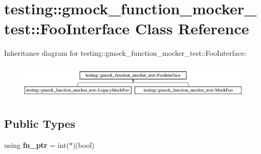 \hypertarget{classtesting_1_1gmock__function__mocker__test_1_1FooInterface}{}\section{testing\+:\+:gmock\+\_\+function\+\_\+mocker\+\_\+test\+:\+:Foo\+Interface Class Reference}
\label{classtesting_1_1gmock__function__mocker__test_1_1FooInterface}
Inheritance diagram for testing\+:\+:gmock\+\_\+function\+\_\+mocker\+\_\+test\+:\+:Foo\+Interface\+:\begin{figure}[H]
\begin{center}
\leavevmode
\includegraphics[height=1.723077cm]{classtesting_1_1gmock__function__mocker__test_1_1FooInterface}
\end{center}
\end{figure}
\subsection*{Public Types}
\begin{DoxyCompactItemize}
\item 
\mbox{\label{classtesting_1_1gmock__function__mocker__test_1_1FooInterface_a70abf7998b6302d9ea2f330ea3e01b8f}} 
using {\bfseries fn\+\_\+ptr} = int($\ast$)(bool)
\end{DoxyCompactItemize}
